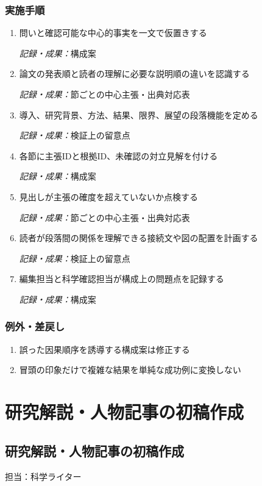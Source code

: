 \documentclass[a4paper,11pt]{article}
\begin{document}
\subsubsection*{実施手順}
\begin{enumerate}[leftmargin=2em,itemsep=0.65em]
\item 問いと確認可能な中心的事実を一文で仮置きする\par\noindent\textit{記録・成果：}構成案\nobreak\smallskip
\item 論文の発表順と読者の理解に必要な説明順の違いを認識する\par\noindent\textit{記録・成果：}節ごとの中心主張・出典対応表\nobreak\smallskip
\item 導入、研究背景、方法、結果、限界、展望の段落機能を定める\par\noindent\textit{記録・成果：}検証上の留意点\nobreak\smallskip
\item 各節に主張IDと根拠ID、未確認の対立見解を付ける\par\noindent\textit{記録・成果：}構成案\nobreak\smallskip
\item 見出しが主張の確度を超えていないか点検する\par\noindent\textit{記録・成果：}節ごとの中心主張・出典対応表\nobreak\smallskip
\item 読者が段落間の関係を理解できる接続文や図の配置を計画する\par\noindent\textit{記録・成果：}検証上の留意点\nobreak\smallskip
\item 編集担当と科学確認担当が構成上の問題点を記録する\par\noindent\textit{記録・成果：}構成案\nobreak\smallskip
\end{enumerate}
\subsubsection*{例外・差戻し}
\begin{enumerate}[leftmargin=2em,itemsep=0.35em]
\item 誤った因果順序を誘導する構成案は修正する
\item 冒頭の印象だけで複雑な結果を単純な成功例に変換しない
\end{enumerate}
\section{研究解説・人物記事の初稿作成}
\subsection{研究解説・人物記事の初稿作成}
\par 担当：科学ライター\par\medskip
\end{document}
